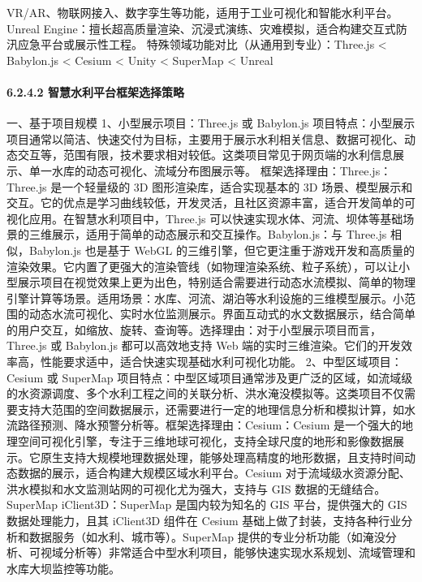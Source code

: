 {VR/AR、物联网接入、数字孪生等功能，适用于工业可视化和智能水利平台。 Unreal Engine：擅长超高质量渲染、沉浸式演练、灾难模拟，适合构建交互式防汛应急平台或展示性工程。 特殊领域功能对比（从通用到专业）：Three.js
\textless{} Babylon.js \textless{} Cesium \textless{} Unity \textless{} SuperMap \textless{} Unreal \paragraph{6.2.4.2
智慧水利平台框架选择策略}\label{ux667aux6167ux6c34ux5229ux5e73ux53f0ux6846ux67b6ux9009ux62e9ux7b56ux7565} 一、基于项目规模 1、小型展示项目：Three.js
或 Babylon.js 项目特点：小型展示项目通常以简洁、快速交付为目标，主要用于展示水利相关信息、数据可视化、动态交互等，范围有限，技术要求相对较低。这类项目常见于网页端的水利信息展示、单一水库的动态可视化、流域分布图展示等。
框架选择理由：Three.js：Three.js 是一个轻量级的 3D 图形渲染库，适合实现基本的 3D 场景、模型展示和交互。它的优点是学习曲线较低，开发灵活，且社区资源丰富，适合开发简单的可视化应用。在智慧水利项目中，Three.js
可以快速实现水体、河流、坝体等基础场景的三维展示，适用于简单的动态展示和交互操作。Babylon.js：与 Three.js 相似，Babylon.js 也是基于 WebGL
的三维引擎，但它更注重于游戏开发和高质量的渲染效果。它内置了更强大的渲染管线（如物理渲染系统、粒子系统），可以让小型展示项目在视觉效果上更为出色，特别适合需要进行动态水流模拟、简单的物理引擎计算等场景。适用场景：水库、河流、湖泊等水利设施的三维模型展示。小范围的动态水流可视化、实时水位监测展示。界面互动式的水文数据展示，结合简单的用户交互，如缩放、旋转、查询等。选择理由：对于小型展示项目而言，Three.js
或 Babylon.js 都可以高效地支持 Web 端的实时三维渲染。它们的开发效率高，性能要求适中，适合快速实现基础水利可视化功能。 2、中型区域项目：Cesium 或 SuperMap
项目特点：中型区域项目通常涉及更广泛的区域，如流域级的水资源调度、多个水利工程之间的关联分析、洪水淹没模拟等。这类项目不仅需要支持大范围的空间数据展示，还需要进行一定的地理信息分析和模拟计算，如水流路径预测、降水预警分析等。框架选择理由：Cesium：Cesium
是一个强大的地理空间可视化引擎，专注于三维地球可视化，支持全球尺度的地形和影像数据展示。它原生支持大规模地理数据处理，能够处理高精度的地形数据，且支持时间动态数据的展示，适合构建大规模区域水利平台。Cesium
对于流域级水资源分配、洪水模拟和水文监测站网的可视化尤为强大，支持与 GIS 数据的无缝结合。SuperMap iClient3D：SuperMap 是国内较为知名的 GIS 平台，提供强大的 GIS 数据处理能力，且其 iClient3D
组件在 Cesium 基础上做了封装，支持各种行业分析和数据服务（如水利、城市等）。SuperMap 提供的专业分析功能（如淹没分析、可视域分析等）非常适合中型水利项目，能够快速实现水系规划、流域管理和水库大坝监控等功能。
}
